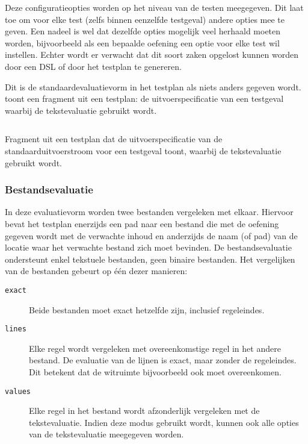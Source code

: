 Deze configuratieopties worden op het niveau van de testen meegegeven.
Dit laat toe om voor elke test (zelfs binnen eenzelfde testgeval) andere opties mee te geven.
Een nadeel is wel dat dezelfde opties mogelijk veel herhaald moeten worden, bijvoorbeeld als een bepaalde oefening een optie voor elke test wil instellen.
Echter wordt er verwacht dat dit soort zaken opgelost kunnen worden door een DSL of door het testplan te genereren.

Dit is de standaardevaluatievorm in het testplan als niets anders gegeven wordt.
 toont een fragment uit een testplan: de uitvoerspecificatie van een testgeval waarbij de tekstevaluatie gebruikt wordt.

\begin{listing}
    \inputminted{json}{code/testplan-text.json}
    \caption{Fragment uit een testplan dat de uitvoerspecificatie van de standaarduitvoerstroom voor een testgeval toont, waarbij de tekstevaluatie gebruikt wordt.}
    \label{lst:testplan-text}
\end{listing}

\subsubsection{Bestandsevaluatie}

In deze evaluatievorm worden twee bestanden vergeleken met elkaar.
Hiervoor bevat het testplan enerzijds een pad naar een bestand die met de oefening gegeven wordt met de verwachte inhoud en anderzijds de naam (of pad) van de locatie waar het verwachte bestand zich moet bevinden.
De bestandsevaluatie ondersteunt enkel tekstuele bestanden, geen binaire bestanden.
Het vergelijken van de bestanden gebeurt op één dezer manieren:

\begin{description}
    \item[\texttt{exact}] Beide bestanden moet exact hetzelfde zijn, inclusief regeleindes.
    \item[\texttt{lines}] Elke regel wordt vergeleken met overeenkomstige regel in het andere bestand.
    De evaluatie van de lijnen is exact, maar zonder de regeleindes.
    Dit betekent dat de witruimte bijvoorbeeld ook moet overeenkomen.
    \item[\texttt{values}] Elke regel in het bestand wordt afzonderlijk vergeleken met de tekstevaluatie.
    Indien deze modus gebruikt wordt, kunnen ook alle opties van de tekstevaluatie meegegeven worden.
\end{description}


